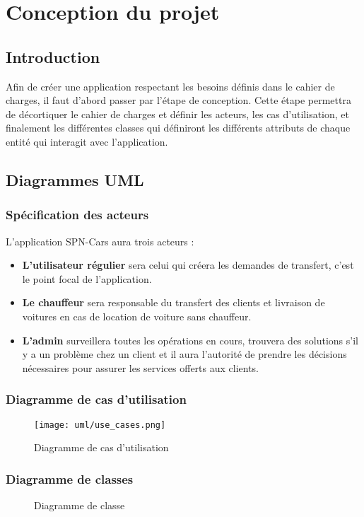 \chapter{Conception du projet}
\minitoc
\cleardoublepage
\section*{Introduction}
Afin de créer une application respectant les besoins définis dans le cahier de charges, il faut d'abord passer par l'étape de conception. Cette étape permettra de décortiquer le cahier de charges et définir les acteurs, les cas d'utilisation, et finalement les différentes classes qui définiront les différents attributs de chaque entité qui interagit avec l'application.
\section{Diagrammes UML}
\subsection{Spécification des acteurs}
L'application SPN-Cars aura trois acteurs :
\begin{itemize}
    \item \textbf{L'utilisateur régulier} sera celui qui créera les demandes de transfert, c'est le point focal de l'application.
    \item \textbf{Le chauffeur} sera responsable du transfert des clients et livraison de voitures en cas de location de voiture sans chauffeur.
    \item \textbf{L'admin} surveillera toutes les opérations en cours, trouvera des solutions s'il y a un problème chez un client et il aura l'autorité de prendre les décisions nécessaires pour assurer les services offerts aux clients.
\end{itemize}
\clearpage

\subsection{Diagramme de cas d'utilisation}
\begin{figure}[h!]
    \centering
    \texttt{[image: uml/use\_cases.png]}
    \vspace{.5cm}
    \caption{Diagramme de cas d'utilisation}
    \label{fig:use_case_diag}
\end{figure}
\clearpage

\subsection{Diagramme de classes}
\begin{figure}[h!]
    \centering
    \vspace{.5cm}
    \caption{Diagramme de classe}
    \label{fig:class_diag}
\end{figure}

